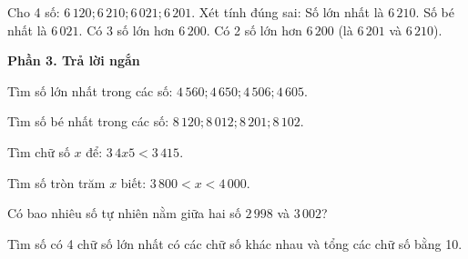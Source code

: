 \begin{ex} %
Cho 4 số: $6\,120; 6\,210; 6\,021; 6\,201$. Xét tính đúng sai:
\choiceTF
{\True Số lớn nhất là $6\,210$.}
{\True Số bé nhất là $6\,021$.}
{Có 3 số lớn hơn $6\,200$.}
{\True Có 2 số lớn hơn $6\,200$ (là $6\,201$ và $6\,210$).}
\end{ex}

\textbf{Phần 3. Trả lời ngắn}

\begin{ex} %
Tìm số lớn nhất trong các số: $4\,560; 4\,650; 4\,506; 4\,605$.
\end{ex}

\begin{ex} %
Tìm số bé nhất trong các số: $8\,120; 8\,012; 8\,201; 8\,102$.
\end{ex}

\begin{ex} %
Tìm chữ số $x$ để: $3\,4x5 < 3\,415$.
\end{ex}

\begin{ex} %
Tìm số tròn trăm $x$ biết: $3\,800 < x < 4\,000$.
\end{ex}

\begin{ex} %
Có bao nhiêu số tự nhiên nằm giữa hai số $2\,998$ và $3\,002$?
\end{ex}

\begin{ex} %
Tìm số có 4 chữ số lớn nhất có các chữ số khác nhau và tổng các chữ số bằng 10.
\end{ex}
